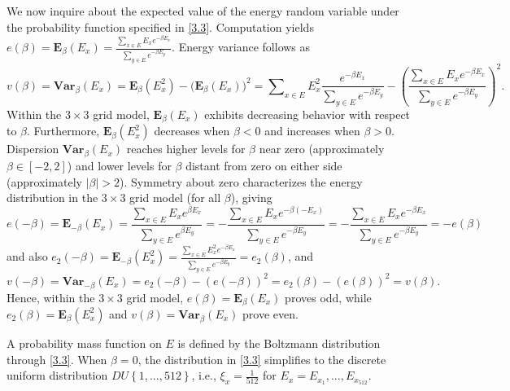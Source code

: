 \documentclass[twoside]{article}
\begin{document}
We now inquire about the expected value of the energy random variable under the probability function specified in \eqref{3.3}. Computation yields
$e(\beta) = {{\boldsymbol{E}}_{\beta }}\left( {{E}_{x}} \right)=\frac{\sum\nolimits_{x\in E}{E_{x}^{{}}{{e}^{-\beta {{E}_{x}}}}}}{\sum\nolimits_{y\in E}{{{e}^{-\beta {{E}_{y}}}}}}$.
Energy variance follows as
\[v(\beta)={\boldsymbol{Var}}_\beta(E_x) = \boldsymbol{E}_\beta(E_x^2) - \Big(\boldsymbol{E}_\beta(E_x)\Big)^2 = \sum\nolimits_{x \in E} E_x^2 \frac{e^{-\beta E_x}}{\sum\nolimits_{y \in E} e^{-\beta E_y}} - \left(\frac{\sum\nolimits_{x \in E} E_x e^{-\beta E_x}}{\sum\nolimits_{y \in E} e^{-\beta E_y}}\right)^2.\]
Within the $3 \times 3$ grid model, ${\boldsymbol{E}_{\beta }}\left( {{E}_{x}} \right)$ exhibits decreasing behavior with respect to $\beta$. Furthermore, ${\boldsymbol{E}_{\beta }}\left( E_{x}^{2} \right)$ decreases when $\beta <0$ and increases when $\beta >0$. Dispersion ${\boldsymbol{Var}_{\beta }}\left( {{E}_{x}} \right)$ reaches higher levels for $\beta$ near zero (approximately $\beta \in \left[-2,2\right]$) and lower levels for $\beta$ distant from zero on either side (approximately $\left| \beta \right|>2$). Symmetry about zero characterizes the energy distribution in the $3\times 3$ grid model (for all $\beta$), giving
\begin{equation} \label{5.1}
e(-\beta) = \boldsymbol{E}_{-\beta}(E_x) = \frac{\sum\nolimits_{x \in E} E_x e^{\beta E_x}}{\sum\nolimits_{y \in E} e^{\beta E_y}} = -\frac{\sum\nolimits_{x \in E} E_x e^{-\beta (-E_x)}}{\sum\nolimits_{y \in E} e^{-\beta E_y}} = -\frac{\sum\nolimits_{x \in E} E_x e^{-\beta E_x}}{\sum\nolimits_{y \in E} e^{-\beta E_y}} = -e(\beta)
\end{equation}
and also ${{e}_{2}}(-\beta) = {\boldsymbol{E}_{-\beta}}\left( E_{x}^{2} \right) = \frac{\sum\nolimits_{x\in E} E_{x}^{2} e^{-\beta E_{x}}}{\sum\nolimits_{y\in E} e^{-\beta E_{y}}} = {{e}_{2}}(\beta)$, and 
\[v(-\beta) = \boldsymbol{Var}_{-\beta}\left( E_{x} \right) = {{e}_{2}}(-\beta) - \left( e(-\beta) \right)^{2} = {{e}_{2}}(\beta) - \left( e(\beta) \right)^{2} = v(\beta).\] Hence, within the $3\times 3$ grid model, $e(\beta )={\boldsymbol{E}_{\beta }}\left( {{E}_{x}} \right)$ proves odd, while ${{e}_{2}}(\beta )={\boldsymbol{E}_{\beta }}\left( E_{x}^{2} \right)$ and $v(\beta )={\boldsymbol{Var}_{\beta }}\left( {{E}_{x}} \right)$ prove even.

A probability mass function on $E$ is defined by the Boltzmann distribution through \eqref{3.3}. When $\beta =0$, the distribution in \eqref{3.3} simplifies to the discrete uniform distribution $DU\left\{ 1,...,512 \right\}$, i.e., ${{\xi }_{x}}=\tfrac{1}{512}$ for ${{E}_{x}}={{E}_{{{x}_{1}}}},...,{{E}_{{{x}_{512}}}}$.
\end{document}
